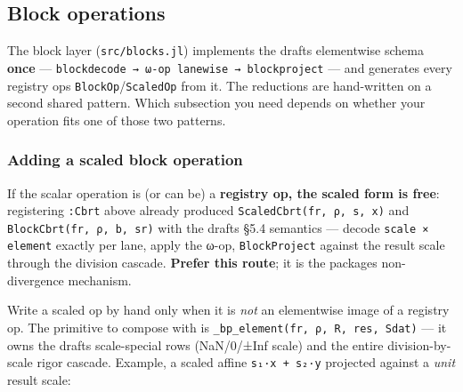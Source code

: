 \subsection{Block operations}



\label{6513894782918662055}{}


The block layer (\texttt{src/blocks.jl}) implements the draft{\textquotesingle}s elementwise schema \textbf{once} — \texttt{blockdecode → ω-op lanewise → blockproject} — and generates every registry op{\textquotesingle}s \texttt{BlockOp}/\allowbreak\texttt{ScaledOp} from it. The reductions are hand-written on a second shared pattern. Which subsection you need depends on whether your operation fits one of those two patterns.



\subsubsection{Adding a scaled block operation}



\label{10512613773019865025}{}


If the scalar operation is (or can be) a \textbf{registry op, the scaled form is free}: registering \texttt{:Cbrt} above already produced \texttt{ScaledCbrt(fr, ρ, s, x)} and \texttt{BlockCbrt(fr, ρ, b, sr)} with the draft{\textquotesingle}s §5.4 semantics — decode \texttt{scale × element} exactly per lane, apply the ω-op, \texttt{BlockProject} against the result scale through the division cascade. \textbf{Prefer this route}; it is the package{\textquotesingle}s non-divergence mechanism.



Write a scaled op by hand only when it is \emph{not} an elementwise image of a registry op. The primitive to compose with is \texttt{\_\allowbreak{}bp\_\allowbreak{}element(\allowbreak{}fr, ρ, R, res, Sdat)} — it owns the draft{\textquotesingle}s scale-special rows (NaN/0/±Inf scale) and the entire division-by-scale rigor cascade. Example, a scaled affine \texttt{s₁·x + s₂·y} projected against a \emph{unit} result scale:




